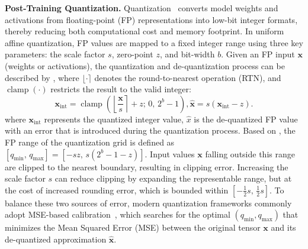 \noindent\textbf{Post-Training Quantization.} Quantization~\cite{krishnamoorthi2018quantizing, nagel2021white} converts model weights and activations from floating-point (FP) representations into low-bit integer formats, thereby reducing both computational cost and memory footprint. 
In uniform affine quantization, FP values are mapped to a fixed integer range using three key parameters: the scale factor $s$, zero-point $z$, and bit-width $b$. 
Given an FP input $\mathbf{x}$ (weights or activations), the quantization and de-quantization process can be described by , where $\lfloor \cdot \rceil$ denotes the round-to-nearest operation (RTN), and $\operatorname{clamp}(\cdot)$ restricts the result to the valid integer:
\begin{equation}
        \mathbf{x}_{\mathrm{int}} = \operatorname{clamp}\left( \left\lfloor \frac{\mathbf{x}}{s} \right\rceil + z;\, 0,\, 2^b - 1 \right), \widehat{\mathbf{x}} = s \left( \mathbf{x}_{\mathrm{int}} - z \right).
        \label{eq: quant and de-quant function}
\end{equation}
where $\mathbf{x}_{\mathrm{int}}$ represents the quantized integer value, $\hat{x}$ is the de-quantized FP value with an error that is introduced during the quantization process. 
Based on , the FP range of the quantization grid is defined as $[q_{\min},\, q_{\max}] = [-sz,\, s(2^b - 1 - z)]$. Input values $\mathbf{x}$ falling outside this range are clipped to the nearest boundary, resulting in clipping error. 
Increasing the scale factor $s$ can reduce clipping by expanding the representable range, but at the cost of increased rounding error, which is bounded within $\left[-\frac{1}{2}s,\, \frac{1}{2}s\right]$. 
To balance these two sources of error, modern quantization frameworks commonly adopt MSE-based calibration~\cite{banner2019post}, which searches for the optimal $(q_{\min}, q_{\max})$ that minimizes the Mean Squared Error (MSE) between the original tensor $\mathbf{x}$ and its de-quantized approximation $\widehat{\mathbf{x}}$.

